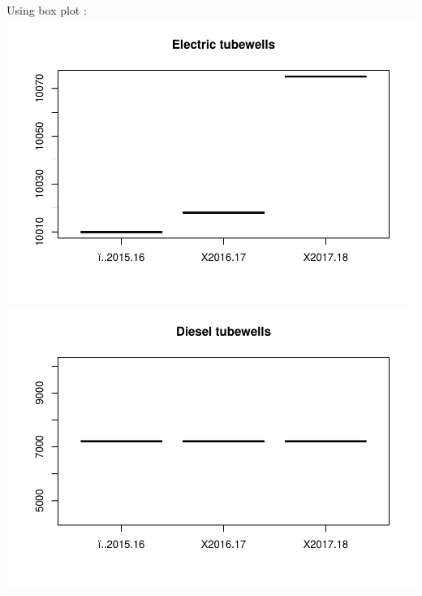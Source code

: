 \documentclass[]{article}
\begin{document}
Using box plot :
\includegraphics{Report_files/figure-latex/unnamed-chunk-34-1.pdf}
\includegraphics{Report_files/figure-latex/unnamed-chunk-34-2.pdf}
\end{document}
